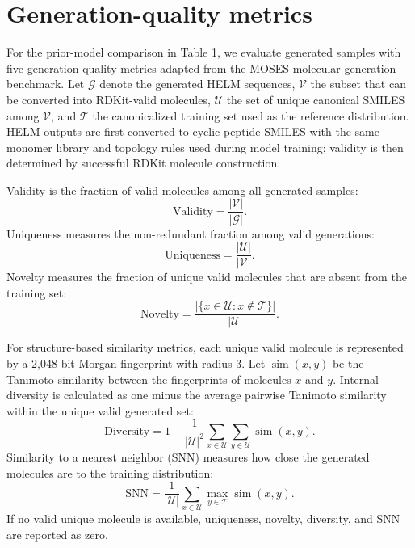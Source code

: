 \documentclass[12pt]{article}
\begin{document}
\section{Generation-quality metrics}
\label{supsec:generation_metrics}

For the prior-model comparison in Table 1, we evaluate generated samples with five generation-quality metrics adapted from the MOSES molecular generation benchmark.
Let $\mathcal{G}$ denote the generated HELM sequences, $\mathcal{V}$ the subset that can be converted into RDKit-valid molecules, $\mathcal{U}$ the set of unique canonical SMILES among $\mathcal{V}$, and $\mathcal{T}$ the canonicalized training set used as the reference distribution.
HELM outputs are first converted to cyclic-peptide SMILES with the same monomer library and topology rules used during model training; validity is then determined by successful RDKit molecule construction.

Validity is the fraction of valid molecules among all generated samples:
\begin{equation}
\mathrm{Validity}=\frac{|\mathcal{V}|}{|\mathcal{G}|}.
\end{equation}
Uniqueness measures the non-redundant fraction among valid generations:
\begin{equation}
\mathrm{Uniqueness}=\frac{|\mathcal{U}|}{|\mathcal{V}|}.
\end{equation}
Novelty measures the fraction of unique valid molecules that are absent from the training set:
\begin{equation}
\mathrm{Novelty}=\frac{|\{x\in\mathcal{U}:x\notin\mathcal{T}\}|}{|\mathcal{U}|}.
\end{equation}

For structure-based similarity metrics, each unique valid molecule is represented by a 2,048-bit Morgan fingerprint with radius 3.
Let $\operatorname{sim}(x,y)$ be the Tanimoto similarity between the fingerprints of molecules $x$ and $y$.
Internal diversity is calculated as one minus the average pairwise Tanimoto similarity within the unique valid generated set:
\begin{equation}
\mathrm{Diversity}=1-\frac{1}{|\mathcal{U}|^2}\sum_{x\in\mathcal{U}}\sum_{y\in\mathcal{U}}\operatorname{sim}(x,y).
\end{equation}
Similarity to a nearest neighbor (SNN) measures how close the generated molecules are to the training distribution:
\begin{equation}
\mathrm{SNN}=\frac{1}{|\mathcal{U}|}\sum_{x\in\mathcal{U}}\max_{y\in\mathcal{T}}\operatorname{sim}(x,y).
\end{equation}
If no valid unique molecule is available, uniqueness, novelty, diversity, and SNN are reported as zero.
\end{document}

